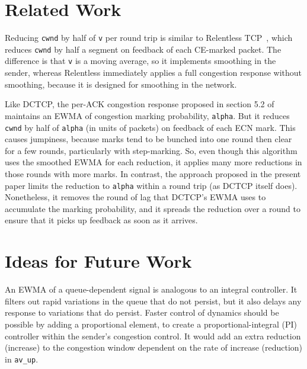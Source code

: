 
\section{Related Work}\label{prresp_related}

Reducing \texttt{cwnd} by half of \texttt{v} per round trip is similar to Relentless TCP~\cite{Mathis09:Relentless}, which reduces \texttt{cwnd} by half a segment on feedback of each CE-marked packet. The difference is that \texttt{v} is a moving average, so it implements smoothing in the sender, whereas Relentless immediately applies a full congestion response without smoothing, because it is designed for smoothing in the network.

Like DCTCP, the per-ACK congestion response proposed in section 5.2 of \cite{Alizadeh11:DCTCP_Analysis} maintains an EWMA of congestion marking probability, \texttt{alpha}. But it reduces \texttt{cwnd} by half of \texttt{alpha} (in units of packets) on feedback of each ECN mark. This causes jumpiness, because marks tend to be bunched into one round then clear for a few rounds, particularly with step-marking. So, even though this algorithm uses the smoothed EWMA for each reduction, it applies many more reductions in those rounds with more marks. In contrast, the approach proposed in the present paper limits the reduction to \texttt{alpha} within a round trip (as DCTCP itself does). Nonetheless, it removes the round of lag that DCTCP's EWMA uses to accumulate the marking probability, and it spreads the reduction over a round to ensure that it picks up feedback as soon as it arrives.

\section{Ideas for Future Work}\label{prresp_future}

An EWMA of a queue-dependent signal is analogous to an integral controller. It filters out rapid variations in the queue that do not persist, but it also delays any response to variations that do persist. Faster control of dynamics should be possible by adding a proportional element, to create a proportional-integral (PI) controller within the sender's congestion control. It would add an extra reduction (increase) to the congestion window dependent on the rate of increase (reduction) in \texttt{av\_up}.

